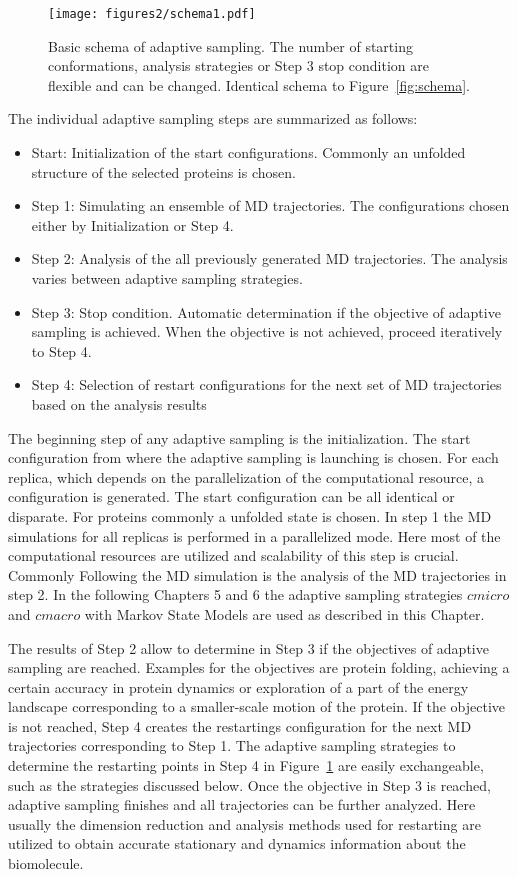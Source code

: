 \begin{figure}[h]
  \centering
  \texttt{[image: figures2/schema1.pdf]}
  \caption{Basic schema of adaptive sampling. The
  number of starting conformations, analysis strategies or Step 3 stop condition are flexible and can be changed. Identical schema to Figure~\ref{fig:schema}.}
  \label{fig:schema2}
\end{figure}

The individual adaptive sampling steps are summarized as follows:
\begin{itemize}
\item Start: Initialization of the start configurations.  Commonly an unfolded structure of the selected proteins is chosen.
\item Step 1: Simulating an ensemble of MD trajectories. The configurations chosen either by Initialization or Step 4. 
\item Step 2: Analysis of the all previously generated MD trajectories. The analysis varies between adaptive sampling strategies.
\item Step 3: Stop condition. Automatic determination if the objective of adaptive sampling is achieved. When the objective is not achieved, proceed iteratively to Step 4. 
\item Step 4: Selection of restart configurations for the next set of MD trajectories based on the analysis results 
\end{itemize}

The beginning step of any adaptive sampling is the initialization. The start configuration from where the adaptive sampling is launching is chosen. For each replica, which depends on the parallelization of the computational resource, a configuration is generated. The start configuration can be all identical or disparate. For proteins commonly a unfolded state is chosen.
In step 1 the MD simulations for all replicas is performed in a parallelized mode. Here most of the computational resources are utilized and scalability of this step is crucial. Commonly  
Following the MD simulation is the analysis of the MD trajectories in step 2. In the following Chapters 5 and 6 the adaptive sampling strategies $cmicro$ and $cmacro$ with Markov State Models \cite{prinz2011markov} are used as described in this Chapter. 

The results of Step 2 allow to determine in Step 3 if the objectives of adaptive sampling are reached. Examples for the objectives are protein folding, achieving a certain accuracy in protein dynamics or exploration of a part of the energy landscape corresponding to a smaller-scale motion of the protein. If the objective is not reached, Step 4 creates the restartings configuration for the next MD trajectories corresponding to Step 1. The adaptive sampling strategies to determine the restarting points in Step 4 in Figure~\ref{fig:schema2} are easily exchangeable, such as the strategies discussed below. Once the objective in Step 3 is reached, adaptive sampling finishes and all trajectories can be further analyzed. Here usually the dimension reduction and analysis methods used for restarting are utilized to obtain accurate stationary and dynamics information about the biomolecule.



